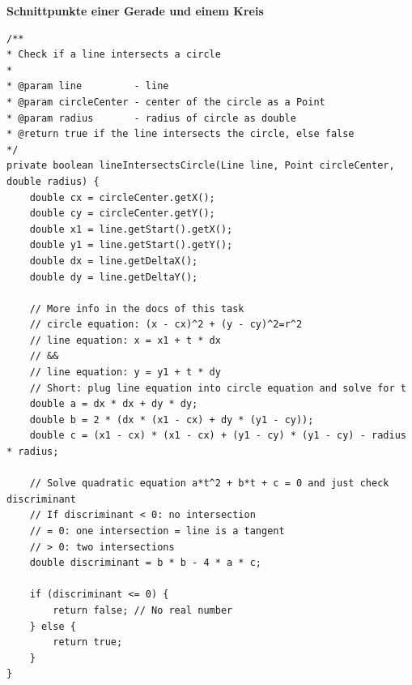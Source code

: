 \documentclass[a4paper,10pt,ngerman]{scrartcl}
\begin{document}
\textbf{Schnittpunkte einer Gerade und einem Kreis}
\begin{lstlisting}
/**
* Check if a line intersects a circle
* 
* @param line         - line
* @param circleCenter - center of the circle as a Point
* @param radius       - radius of circle as double
* @return true if the line intersects the circle, else false
*/
private boolean lineIntersectsCircle(Line line, Point circleCenter, double radius) {
    double cx = circleCenter.getX();
    double cy = circleCenter.getY();
    double x1 = line.getStart().getX();
    double y1 = line.getStart().getY();
    double dx = line.getDeltaX();
    double dy = line.getDeltaY();

    // More info in the docs of this task
    // circle equation: (x - cx)^2 + (y - cy)^2=r^2
    // line equation: x = x1 + t * dx
    // &&
    // line equation: y = y1 + t * dy
    // Short: plug line equation into circle equation and solve for t
    double a = dx * dx + dy * dy;
    double b = 2 * (dx * (x1 - cx) + dy * (y1 - cy));
    double c = (x1 - cx) * (x1 - cx) + (y1 - cy) * (y1 - cy) - radius * radius;

    // Solve quadratic equation a*t^2 + b*t + c = 0 and just check discriminant
    // If discriminant < 0: no intersection
    // = 0: one intersection = line is a tangent
    // > 0: two intersections
    double discriminant = b * b - 4 * a * c;

    if (discriminant <= 0) {
        return false; // No real number
    } else {
        return true;
    }
}
\end{lstlisting}
\end{document}
